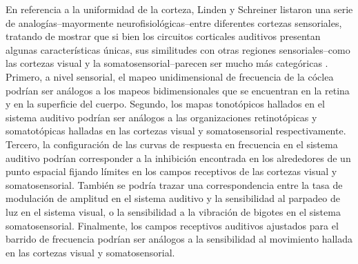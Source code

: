 
En referencia a la uniformidad de la corteza, Linden y Schreiner listaron una serie de analogías--mayormente neurofisiológicas--entre diferentes cortezas sensoriales, tratando de mostrar que si bien los circuitos corticales auditivos presentan algunas características únicas, sus similitudes con otras regiones sensoriales--como las cortezas visual y la somatosensorial--parecen ser mucho más categóricas \cite{linden_2003}. Primero, a nivel sensorial, el mapeo unidimensional de frecuencia de la cóclea podrían ser análogos a los mapeos bidimensionales que se encuentran en la retina y en la superficie del cuerpo. Segundo, los mapas tonotópicos hallados en el sistema auditivo podrían ser análogos a las organizaciones retinotópicas y somatotópicas halladas en las cortezas visual y somatosensorial respectivamente. Tercero, la configuración de las curvas de respuesta en frecuencia en el sistema auditivo podrían corresponder a la inhibición encontrada en los alrededores de un punto espacial fijando límites en los campos receptivos de las cortezas visual y somatosensorial. También se podría trazar una correspondencia entre la tasa de modulación de amplitud en el sistema auditivo y la sensibilidad al parpadeo de luz en el sistema visual, o la sensibilidad a la vibración de bigotes en el sistema somatosensorial. Finalmente, los campos receptivos auditivos ajustados para el barrido de frecuencia podrían ser análogos a la sensibilidad al movimiento hallada en las cortezas visual y somatosensorial. 


